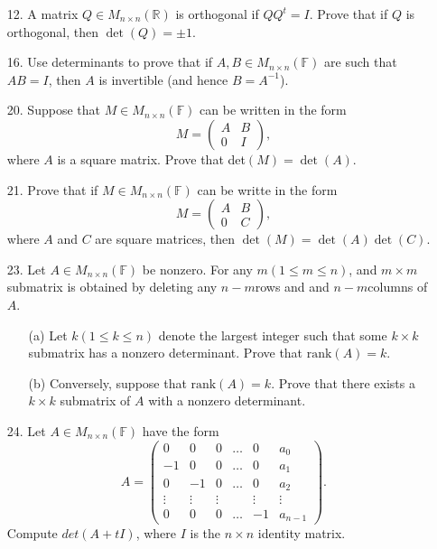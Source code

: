 \begin{enumerate}
    \item[12.] A matrix \(Q \in M_{n \times n}(\mathbb{R})\) is orthogonal if \(QQ^t = I\). Prove that if \(Q\) is orthogonal, then \(\det (Q) = \pm 1\). \vspace{3cm}
    \item[16.] Use determinants to prove that if \(A,B \in M_{n \times n}(\mathbb{F})\) are such that \(AB = I\), then \(A\) is invertible (and hence \(B = A^{-1}\)). \vspace{3cm}
    \item[20.] Suppose that \(M \in M_{n \times n}(\mathbb{F})\) can be written in the form \[ M = \begin{pmatrix}
        A & B \\
        0 & I
    \end{pmatrix},\] where \(A\) is a square matrix. Prove that det\((M) = \det(A)\). \vspace{5cm}
    \item[21.] Prove that if \(M \in M_{n \times n}(\mathbb{F})\) can be writte in the form \[ M = \begin{pmatrix}
        A & B \\
        0 & C
        \end{pmatrix},\] where \(A\) and \(C\) are square matrices, then \(\det (M) = \det (A) \det (C)\). \vspace{5cm}
    \item[23.] Let \(A \in M_{n \times n}(\mathbb{F})\) be nonzero. For any \(m (1 \leq m \leq n)\), and \(m \times m \) submatrix is obtained by deleting any \(n-m\)rows and and \(n-m\)columns of \(A\).
    \begin{enumerate}
        \item[(a)] Let \(k (1 \leq k \leq n)\) denote the largest integer such that some \(k \times k\) submatrix has a nonzero determinant. Prove that \(\text{rank}(A) = k\).
        \item[(b)] Conversely, suppose that \(\text{rank}(A) = k\). Prove that there exists a \(k \times k\) submatrix of \(A\) with a nonzero determinant.
    \end{enumerate}
    \vspace{5cm}
    \item[24.] Let \(A \in M_{n \times n}(\mathbb{F})\) have the form \[ A = \begin{pmatrix}
        0 &0& 0& \dots & 0& a_0 \\
        -1& 0& 0 &\dots & 0 &a_1 \\
        0 &-1& 0& \dots & 0& a_2 \\
        \vdots& \vdots& \vdots & & \vdots & \vdots \\
        0 &0 &0 &\dots& -1 & a_{n-1}
        \end{pmatrix}.\] Compute \(det(A+tI)\), where \(I\) is the \(n \times n\) identity matrix. \vspace{5cm}
\end{enumerate}


